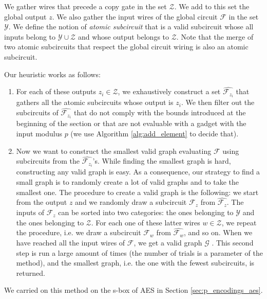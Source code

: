 We gather wires that precede a copy gate in the set $\mathcal{Z}$. We add to this set the global output $z$. We also gather the input wires of the global circuit $\mathcal{F}$ in the set $\mathcal{Y}$. We define the notion of \textit{atomic subcircuit} that is a valid subcircuit whose all inputs belong to $\mathcal{Y} \cup \mathcal{Z}$ and whose output belongs to $\mathcal{Z}$. Note that the merge of two atomic subcircuits that respect the global circuit wiring is also an atomic subcircuit.

\medskip

Our heuristic works as follows:

\begin{enumerate}
    \item For each of these outputs $z_i \in \mathcal{Z}$, we exhaustively construct a set $\widehat{\mathcal{F}_{z_{i}}}$ that gathers all the atomic subcircuits whose output is $z_i$.
    We then filter out the subcircuits of $\widehat{\mathcal{F}_{z_{i}}}$ that do not comply with the bounds introduced at the beginning of the section or that are not evaluable with a gadget with the input modulus $p$ (we use Algorithm \ref{alg:add_element} to decide that).
    \medskip
    \item Now we want to construct the smallest valid graph evaluating $\mathcal{F}$ using subcircuits from the $\widehat{\mathcal{F}_{z_{i}}}$'s. While finding the smallest graph is hard, constructing any valid graph is easy. As a consequence, our strategy to find a small graph is to randomly create a lot of valid graphs and to take the smallest one. The procedure to create a valid graph is the following: we start from the output $z$ and we randomly draw a subcircuit $\mathcal{F}_z$ from $\widehat{\mathcal{F}_z}$. The inputs of $\mathcal{F}_z$ can be sorted into two categories: the ones belonging to $\mathcal{Y}$ and the ones belonging to $\mathcal{Z}$. For each one of these latter wires $w \in \mathcal{Z}$, we repeat the procedure, i.e. we draw a subcircuit $\mathcal{F}_w$ from $\widehat{\mathcal{F}_w}$, and so on. When we have reached all the input wires of $\mathcal{F}$, we get a valid graph $\mathcal{G}$ . This second step is run a large amount of times (the number of trials is a parameter of the method), and the smallest graph, i.e. the one with the fewest subcircuits, is returned.
\end{enumerate}

We carried on this method on the s-box of AES in Section \ref{sec:p_encodings_aes}.

